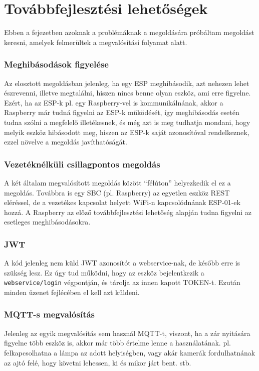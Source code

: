 \documentclass[
]{thesis-ekf}
\theoremstyle{definition}
\theoremstyle{remark}
\begin{document}
\chapter{Továbbfejlesztési lehetőségek}\label{tovabbfejlesztes}
Ebben a fejezetben azoknak a problémáknak a megoldására próbáltam megoldást keresni, amelyek felmerültek a megvalósítási folyamat alatt.

\subsection*{Meghibásodások figyelése}
Az elosztott megoldásban jelenleg, ha egy ESP meghibásodik, azt nehezen lehet észrevenni, illetve megtalálni, hiszen nincs benne olyan eszköz, ami erre figyelne. Ezért, ha az ESP-k pl. egy Raspberry-vel is kommunikálnának, akkor a Raspberry már tudná figyelni az ESP-k működését, így meghibásodás esetén tudna szólni a megfelelő illetékesnek, és még azt is meg tudhatja mondani, hogy melyik eszköz hibásodott meg, hiszen az ESP-k saját azonosítóval rendelkeznek, ezzel növelve a megoldás javíthatóságát.

\subsection*{Vezetéknélküli csillagpontos megoldás}
A két általam megvalósított megoldás között \enquote{félúton} helyezkedik el ez a megoldás. Továbbra is egy SBC (pl. Raspberry) az egyetlen eszköz REST eléréssel, de a vezetékes kapcsolat helyett WiFi-n kapcsolódnának ESP-01-ek hozzá. A Raspberry az előző továbbfejlesztési lehetőség alapján tudna figyelni az esetleges meghibásodásokra. 

\subsection*{JWT}
A kód jelenleg nem küld JWT azonosítót a webservice-nak, de később erre is szükség lesz. Ez úgy tud működni, hogy az eszköz bejelentkezik a \texttt{webservice/login} végpontján, és tárolja az innen kapott TOKEN-t. Ezután minden üzenet fejlécében el kell azt küldeni.

\subsection*{MQTT-s megvalósítás}
Jelenleg az egyik megvalósítás sem használ MQTT-t, viszont, ha a zár nyitására figyelne több eszköz is, akkor már több értelme lenne a használatának. pl. felkapcsolhatna a lámpa az adott helyiségben, vagy akár kamerák fordulhatnának az ajtó felé, hogy követni lehessen, ki és mikor járt bent. stb.
\end{document}
